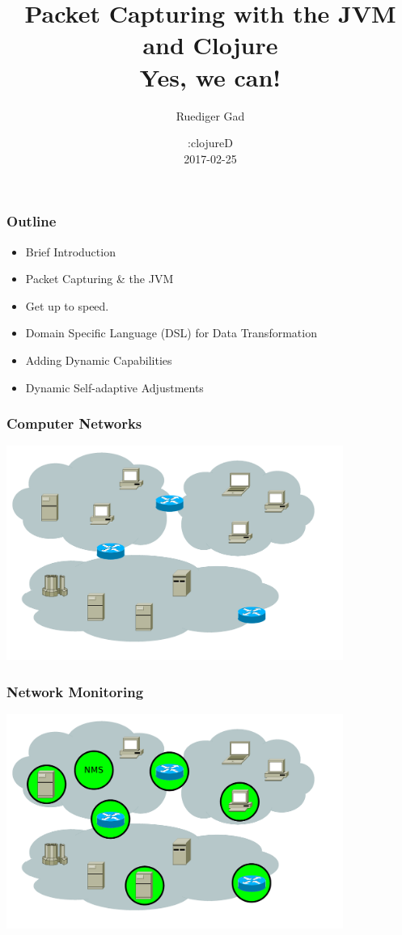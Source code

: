 \documentclass[aspectratio=169]{beamer}
\title[Packet Capturing with the JVM and Clojure - Yes, we can!]{Packet Capturing with the JVM and Clojure\\Yes, we can!}
\author[Ruediger Gad - Terma GmbH, Space - Darmstadt, Germany]{Ruediger Gad}
\institute[]{
  Terma GmbH, Space, Darmstadt, Germany
  }
\date{:clojureD\\2017-02-25}
\begin{document}
	\begin{frame}[plain]
		\titlepage
	\end{frame}

  \begin{frame}
    \frametitle{Outline}

      \begin{itemize}
          \item Brief Introduction
          \item Packet Capturing \& the JVM
          \item Get up to speed.
          \item Domain Specific Language (DSL) for Data Transformation
          \item Adding Dynamic Capabilities
          \item Dynamic Self-adaptive Adjustments
      \end{itemize}
  \end{frame}

  \begin{frame}
    \frametitle{Computer Networks}

      \begin{center}
          \includegraphics[width=11cm]{images/self_adaptive_network_analysis_and_surveillance_system_8_without_NAaS}
      \end{center}
  \end{frame}

  \begin{frame}
    \frametitle{Network Monitoring}

      \begin{center}
          \includegraphics[width=11cm]{images/self_adaptive_network_analysis_and_surveillance_system_8}
      \end{center}
  \end{frame}
\end{document}
